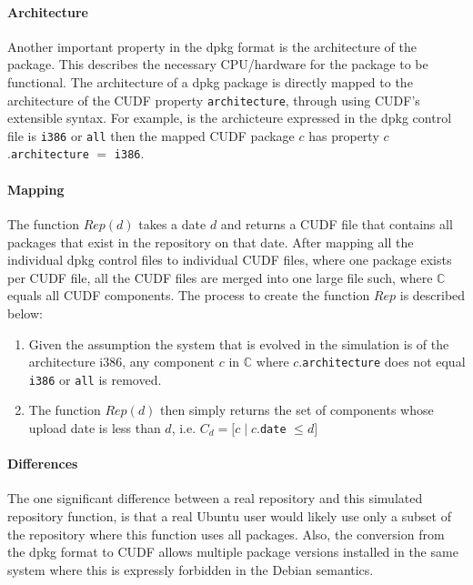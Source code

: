 \paragraph{Architecture}
Another important property in the dpkg format is the architecture of the package.
This describes the necessary CPU/hardware for the package to be functional.
The architecture of a dpkg package is directly mapped to the architecture of the CUDF property \verb+architecture+, through using CUDF's extensible syntax.
For example, is the archicteure expressed in the dpkg control file is \verb+i386+ or \verb+all+ then the mapped CUDF package $c$ has property $c$.\verb+architecture+ $=$ \verb+i386+.

\paragraph{Mapping}
The function $Rep(d)$ takes a date $d$ and returns a CUDF file that contains all packages that exist in the repository on that date.
After mapping all the individual dpkg control files to individual CUDF files, where one package exists per CUDF file,
all the CUDF files are merged into one large file such, where $\mathbb{C}$ equals all CUDF components.
The process to create the function $Rep$ is described below:
\begin{enumerate}
  \item Given the assumption the system that is evolved in the simulation is of the architecture i386, 
  any component $c$ in $\mathbb{C}$ where $c$.\verb+architecture+ does not equal \verb+i386+ or \verb+all+ is removed.
  \item The function $Rep(d)$ then simply returns the set of components whose upload date is less than $d$, i.e. $C_d = [c \mid c$.\verb+date+ $ \leq d]$
\end{enumerate}

\paragraph{Differences}
The one significant difference between a real repository and this simulated repository function,
is that a real Ubuntu user would likely use only a subset of the repository where this function uses all packages. 
Also, the conversion from the dpkg format to CUDF allows multiple package versions installed in the same system where this is expressly forbidden in the Debian semantics. 

